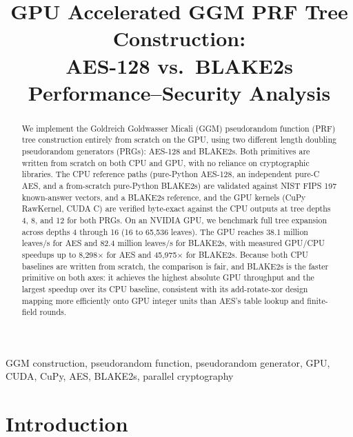 \documentclass[conference]{IEEEtran}
\begin{document}
\title{GPU Accelerated GGM PRF Tree Construction:\\
AES-128 vs.\ BLAKE2s Performance--Security Analysis}

\author{
}

\maketitle

\begin{abstract}
We implement the Goldreich Goldwasser Micali (GGM) pseudorandom function (PRF) tree construction entirely from scratch on the GPU, using two different length doubling pseudorandom generators (PRGs): AES-128 and BLAKE2s. Both primitives are written from scratch on both CPU and GPU, with no reliance on cryptographic libraries. The CPU reference paths (pure-Python AES-128, an independent pure-C AES, and a from-scratch pure-Python BLAKE2s) are validated against NIST FIPS 197 known-answer vectors, and a BLAKE2s reference, and the GPU kernels (CuPy RawKernel, CUDA C) are verified byte-exact against the CPU outputs at tree depths 4, 8, and 12 for both PRGs. On an NVIDIA GPU, we benchmark full tree expansion across depths 4 through 16 (16 to 65,536 leaves). The GPU reaches 38.1 million leaves/s for AES and 82.4 million leaves/s for BLAKE2s, with measured GPU/CPU speedups up to 8,298$\times$ for AES and 45,975$\times$ for BLAKE2s. Because both CPU baselines are written from scratch, the comparison is fair, and BLAKE2s is the faster primitive on both axes: it achieves the highest absolute GPU throughput and the largest speedup over its CPU baseline, consistent with its add-rotate-xor design mapping more efficiently onto GPU integer units than AES's table lookup and finite-field rounds.
\end{abstract}

\begin{IEEEkeywords}
GGM construction, pseudorandom function, pseudorandom generator, GPU, CUDA, CuPy, AES, BLAKE2s, parallel cryptography
\end{IEEEkeywords}

\section{Introduction}
\end{document}

